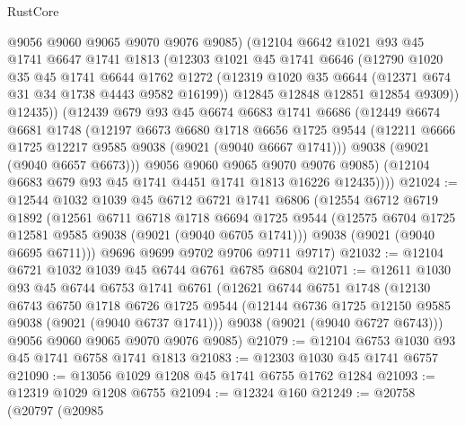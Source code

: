\begin{lexlean}{RustCore}
\begin{coremodule}
            @9056
            @9060
            @9065
            @9070
            @9076
            @9085)
          (@12104
            @6642
            @1021
            @93
            @45
            @1741
            @6647
            @1741
            @1813
            (@12303
              @1021
              @45
              @1741
              @6646
              (@12790
                @1020
                @35
                @45
                @1741
                @6644
                @1762
                @1272
                (@12319 @1020 @35 @6644 (@12371 @674 @31 @34 @1738 @4443 @9582 @16199))
                @12845
                @12848
                @12851
                @12854
                @9309))
            @12435))
        (@12439
          @679
          @93
          @45
          @6674
          @6683
          @1741
          @6686
          (@12449
            @6674
            @6681
            @1748
            (@12197
              @6673
              @6680
              @1718
              @6656
              @1725
              @9544
              (@12211 @6666 @1725 @12217 @9585 @9038 (@9021 (@9040 @6667 @1741)))
              @9038
              (@9021 (@9040 @6657 @6673)))
            @9056
            @9060
            @9065
            @9070
            @9076
            @9085)
          (@12104 @6683 @679 @93 @45 @1741 @4451 @1741 @1813 @16226 @12435))))
@21024 := @12544
    @1032
    @1039
    @45
    @6712
    @6721
    @1741
    @6806
    (@12554
      @6712
      @6719
      @1892
      (@12561
        @6711
        @6718
        @1718
        @6694
        @1725
        @9544
        (@12575 @6704 @1725 @12581 @9585 @9038 (@9021 (@9040 @6705 @1741)))
        @9038
        (@9021 (@9040 @6695 @6711)))
      @9696
      @9699
      @9702
      @9706
      @9711
      @9717)
@21032 := @12104 @6721 @1032 @1039 @45 @6744 @6761 @6785 @6804
@21071 := @12611
    @1030
    @93
    @45
    @6744
    @6753
    @1741
    @6761
    (@12621
      @6744
      @6751
      @1748
      (@12130
        @6743
        @6750
        @1718
        @6726
        @1725
        @9544
        (@12144 @6736 @1725 @12150 @9585 @9038 (@9021 (@9040 @6737 @1741)))
        @9038
        (@9021 (@9040 @6727 @6743)))
      @9056
      @9060
      @9065
      @9070
      @9076
      @9085)
@21079 := @12104 @6753 @1030 @93 @45 @1741 @6758 @1741 @1813
@21083 := @12303 @1030 @45 @1741 @6757
@21090 := @13056 @1029 @1208 @45 @1741 @6755 @1762 @1284
@21093 := @12319 @1029 @1208 @6755
@21094 := @12324 @160
@21249 := @20758
    (@20797
      (@20985

\end{coremodule}
\end{lexlean}
